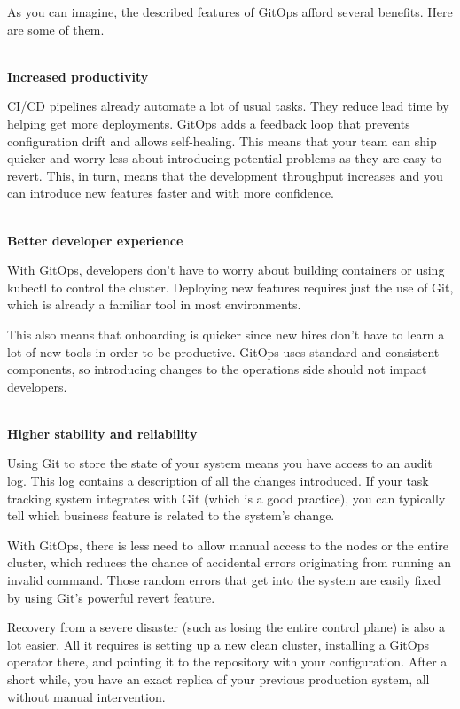 
As you can imagine, the described features of GitOps afford several benefits. Here are some of them.

\hspace*{\fill} \\ %
\noindent
\textbf{Increased productivity}

CI/CD pipelines already automate a lot of usual tasks. They reduce lead time by helping get more deployments. GitOps adds a feedback loop that prevents configuration drift and allows self-healing. This means that your team can ship quicker and worry less about introducing potential problems as they are easy to revert. This, in turn, means that the development throughput increases and you can introduce new features faster and with more confidence.

\hspace*{\fill} \\ %
\noindent
\textbf{Better developer experience}

With GitOps, developers don't have to worry about building containers or using kubectl to control the cluster. Deploying new features requires just the use of Git, which is already a familiar tool in most environments.

This also means that onboarding is quicker since new hires don't have to learn a lot of new tools in order to be productive. GitOps uses standard and consistent components, so introducing changes to the operations side should not impact developers.

\hspace*{\fill} \\ %
\noindent
\textbf{Higher stability and reliability}

Using Git to store the state of your system means you have access to an audit log. This log contains a description of all the changes introduced. If your task tracking system integrates with Git (which is a good practice), you can typically tell which business feature is related to the system's change.

With GitOps, there is less need to allow manual access to the nodes or the entire cluster, which reduces the chance of accidental errors originating from running an invalid command. Those random errors that get into the system are easily fixed by using Git's powerful revert feature.

Recovery from a severe disaster (such as losing the entire control plane) is also a lot easier. All it requires is setting up a new clean cluster, installing a GitOps operator there, and pointing it to the repository with your configuration. After a short while, you have an exact replica of your previous production system, all without manual intervention.


